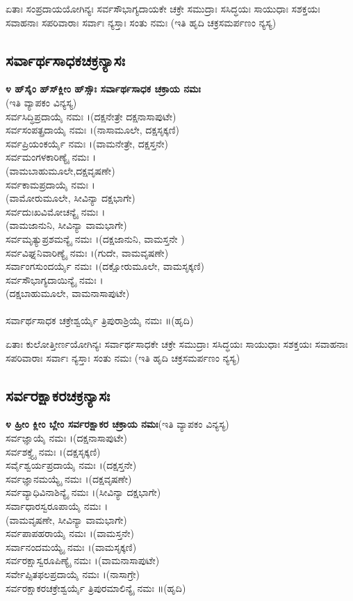  ಏತಾಃ ಸಂಪ್ರದಾಯಯೋಗಿನ್ಯಃ ಸರ್ವಸೌಭಾಗ್ಯದಾಯಕೇ ಚಕ್ರೇ ಸಮುದ್ರಾಃ ಸಸಿದ್ಧಯಃ ಸಾಯುಧಾಃ ಸಶಕ್ತಯಃ ಸವಾಹನಾಃ ಸಪರಿವಾರಾಃ ಸರ್ವಾಃ ನ್ಯಸ್ತಾಃ ಸಂತು ನಮಃ (ಇತಿ ಹೃದಿ ಚಕ್ರಸಮರ್ಪಣಂ ನ್ಯಸ್ಯ)
\subsection{ಸರ್ವಾರ್ಥಸಾಧಕಚಕ್ರನ್ಯಾಸಃ}
{\bfseries ೪ ಹ್‌ಸೈಂ ಹ್‌ಸ್‌ಕ್ಲೀಂ ಹ್‌ಸ್ಸೌಃ ಸರ್ವಾರ್ಥಸಾಧಕ ಚಕ್ರಾಯ ನಮಃ}\\(ಇತಿ ವ್ಯಾಪಕಂ ವಿನ್ಯಸ್ಯ)\\
 ಸರ್ವಸಿದ್ಧಿಪ್ರದಾಯೈ ನಮಃ ।(ದಕ್ಷನೇತ್ರೇ ದಕ್ಷನಾಸಾಪುಟೇ)\\
 ಸರ್ವಸಂಪತ್ಪ್ರದಾಯೈ ನಮಃ ।(ನಾಸಾಮೂಲೇ, ದಕ್ಷಸೃಕ್ಕಣಿ)\\
 ಸರ್ವಪ್ರಿಯಂಕರ್ಯೈ ನಮಃ ।(ವಾಮನೇತ್ರೇ, ದಕ್ಷಸ್ತನೇ)\\
 ಸರ್ವಮಂಗಳಕಾರಿಣ್ಯೈ ನಮಃ ।\\(ವಾಮಬಾಹುಮೂಲೇ,ದಕ್ಷವೃಷಣೇ)\\
 ಸರ್ವಕಾಮಪ್ರದಾಯೈ ನಮಃ ।\\(ವಾಮೋರುಮೂಲೇ, ಸೀವಿನ್ಯಾ ದಕ್ಷಭಾಗೇ)\\
 ಸರ್ವದುಃಖವಿಮೋಚನ್ಯೈ ನಮಃ ।\\(ವಾಮಜಾನುನಿ, ಸೀವಿನ್ಯಾ ವಾಮಭಾಗೇ)\\
 ಸರ್ವಮೃತ್ಯುಪ್ರಶಮನ್ಯೈ ನಮಃ ।(ದಕ್ಷಜಾನುನಿ, ವಾಮಸ್ತನೇ )\\
 ಸರ್ವವಿಘ್ನನಿವಾರಿಣ್ಯೈ ನಮಃ ।(ಗುದೇ, ವಾಮವೃಷಣೇ)\\
 ಸರ್ವಾಂಗಸುಂದರ್ಯೈ ನಮಃ ।(ದಕ್ಷೋರುಮೂಲೇ, ವಾಮಸೃಕ್ಕಣಿ)\\
 ಸರ್ವಸೌಭಾಗ್ಯದಾಯಿನ್ಯೈ ನಮಃ ।\\(ದಕ್ಷಬಾಹುಮೂಲೇ, ವಾಮನಾಸಾಪುಟೇ)\\
 \\ಸರ್ವಾರ್ಥಸಾಧಕ ಚಕ್ರೇಶ್ವರ್ಯೈ ತ್ರಿಪುರಾಶ್ರಿಯೈ ನಮಃ ॥(ಹೃದಿ)

 ಏತಾಃ ಕುಲೋತ್ತೀರ್ಣಯೋಗಿನ್ಯಃ ಸರ್ವಾರ್ಥಸಾಧಕೇ ಚಕ್ರೇ ಸಮುದ್ರಾಃ ಸಸಿದ್ಧಯಃ ಸಾಯುಧಾಃ ಸಶಕ್ತಯಃ ಸವಾಹನಾಃ ಸಪರಿವಾರಾಃ ಸರ್ವಾಃ ನ್ಯಸ್ತಾಃ ಸಂತು ನಮಃ (ಇತಿ ಹೃದಿ ಚಕ್ರಸಮರ್ಪಣಂ ನ್ಯಸ್ಯ)
\subsection{ಸರ್ವರಕ್ಷಾಕರಚಕ್ರನ್ಯಾಸಃ}
{\bfseries ೪ ಹ್ರೀಂ ಕ್ಲೀಂ ಬ್ಲೇಂ ಸರ್ವರಕ್ಷಾಕರ ಚಕ್ರಾಯ ನಮಃ}(ಇತಿ ವ್ಯಾಪಕಂ ವಿನ್ಯಸ್ಯ)\\
 ಸರ್ವಜ್ಞಾಯೈ ನಮಃ ।(ದಕ್ಷನಾಸಾಪುಟೇ)\\
 ಸರ್ವಶಕ್ತ್ಯೈ ನಮಃ ।(ದಕ್ಷಸೃಕ್ಕಣಿ)\\
 ಸರ್ವೈಶ್ವರ್ಯಪ್ರದಾಯೈ ನಮಃ ।(ದಕ್ಷಸ್ತನೇ)\\
 ಸರ್ವಜ್ಞಾನಮಯ್ಯೈ ನಮಃ ।(ದಕ್ಷವೃಷಣೇ)\\
 ಸರ್ವವ್ಯಾಧಿವಿನಾಶಿನ್ಯೈ ನಮಃ ।(ಸೀವಿನ್ಯಾ ದಕ್ಷಭಾಗೇ)\\
 ಸರ್ವಾಧಾರಸ್ವರೂಪಾಯೈ ನಮಃ ।\\(ವಾಮವೃಷಣೇ, ಸೀವಿನ್ಯಾ ವಾಮಭಾಗೇ)\\
 ಸರ್ವಪಾಪಹರಾಯೈ ನಮಃ ।(ವಾಮಸ್ತನೇ)\\
 ಸರ್ವಾನಂದಮಯ್ಯೈ ನಮಃ ।(ವಾಮಸೃಕ್ಕಣಿ)\\
 ಸರ್ವರಕ್ಷಾಸ್ವರೂಪಿಣ್ಯೈ ನಮಃ ।(ವಾಮನಾಸಾಪುಟೇ)\\
 ಸರ್ವೇಪ್ಸಿತಫಲಪ್ರದಾಯೈ ನಮಃ ।(ನಾಸಾಗ್ರೇ)\\
 ಸರ್ವರಕ್ಷಾಕರಚಕ್ರೇಶ್ವರ್ಯೈ ತ್ರಿಪುರಮಾಲಿನ್ಯೈ ನಮಃ ॥(ಹೃದಿ)

